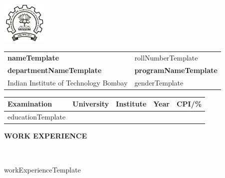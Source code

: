 \documentclass[a4paper,10pt]{article}
\newcommand{\resheading}[1]{{\small \colorbox{mygrey}{\begin{minipage}{0.99\textwidth}{\textbf{#1 \vphantom{p\^{E}}}}\end{minipage}}}}
\begin{document}


\begin{table}
    \begin{minipage}{0.15\linewidth}
        \centering
        \includegraphics[height =0.8in]{iit_logo.png}
    \end{minipage}
    \begin{minipage}{0.65\linewidth}
        \setlength{\tabcolsep}{70pt}
        \def\arraystretch{1.15}
        \begin{tabular}{ll}
            \textbf{\Large{nameTemplate}}  &  {rollNumberTemplate} \\
            \textbf{departmentNameTemplate} & \textbf{programNameTemplate} \\
            Indian Institute of Technology Bombay &  {genderTemplate}\\
        \end{tabular}
    \end{minipage}\hfill
\end{table}    

\setlength{\tabcolsep}{25pt}
\begin{table}
\centering
\begin{tabular}{lllll}
\toprule
\textbf{Examination}    & \textbf{University}   & \textbf{Institute}    & \textbf{Year}     & \textbf{CPI/\%} \\ 
\toprule
educationTemplate
\bottomrule \\[-0.75cm]
\end{tabular}
\end{table}

\noindent
\resheading{\textbf{WORK EXPERIENCE}}\\[-0.3cm]
\begin{itemize}
workExperienceTemplate
\end{itemize}
\end{document}
